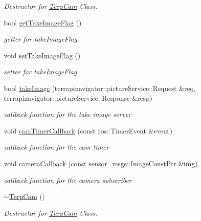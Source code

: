 \begin{DoxyCompactItemize}
\begin{DoxyCompactList}\small\item\em Destructor for \hyperlink{classTerpCam}{Terp\+Cam} Class. \end{DoxyCompactList}\item 
bool \hyperlink{classTerpCam_acfc8df6c8c13209279afe270cd55021d}{get\+Take\+Image\+Flag} ()
\begin{DoxyCompactList}\small\item\em getter for take\+Image\+Flag \end{DoxyCompactList}\item 
void \hyperlink{classTerpCam_ae61767e8357dfe8ceccdd04734e3e94d}{set\+Take\+Image\+Flag} ()
\begin{DoxyCompactList}\small\item\em setter for take\+Image\+Flag \end{DoxyCompactList}\item 
bool \hyperlink{classTerpCam_a17bb8fc53fd73ab9c4138b02eed3b62b}{take\+Image} (terrapinavigator\+::picture\+Service\+::\+Request \&req, terrapinavigator\+::picture\+Service\+::\+Response \&resp)
\begin{DoxyCompactList}\small\item\em callback function for the take image server \end{DoxyCompactList}\item 
void \hyperlink{classTerpCam_a7315af3e74448baf8ffa3d5d81020530}{cam\+Timer\+Callback} (const ros\+::\+Timer\+Event \&event)
\begin{DoxyCompactList}\small\item\em callback function for the cam timer \end{DoxyCompactList}\item 
void \hyperlink{classTerpCam_aa847acf259a1108ad7c15a92e0be291b}{camera\+Callback} (const sensor\+\_\+msgs\+::\+Image\+Const\+Ptr \&img)
\begin{DoxyCompactList}\small\item\em callback function for the camera subscriber \end{DoxyCompactList}\item 
\hyperlink{classTerpCam_abf1740200fd7d293b92d37ddcd8d4c43}{$\sim$\+Terp\+Cam} ()\hypertarget{classTerpCam_abf1740200fd7d293b92d37ddcd8d4c43}{}\label{classTerpCam_abf1740200fd7d293b92d37ddcd8d4c43}

\begin{DoxyCompactList}\small\item\em Destructor for \hyperlink{classTerpCam}{Terp\+Cam} Class. \end{DoxyCompactList}\end{DoxyCompactItemize}


